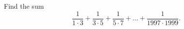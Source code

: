 Find the sum
\[
\dfrac{1}{1\cdot3}+\dfrac{1}{3\cdot5}+\dfrac{1}{5\cdot7}+\dots+\dfrac{1}{1997\cdot1999}.
\]
